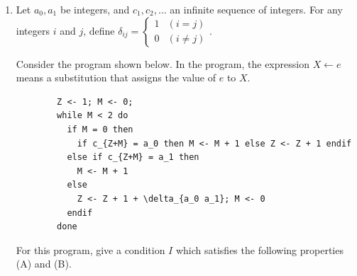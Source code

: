 \documentclass{article}
\begin{document}
\begin{enumerate}[label=\fbox{\arabic*}]
        Answer the following questions (1)-(4).
        \begin{enumerate}[label=(\arabic*)]
          \item Let us introduce the stream function $\psi(x, y, t)$ as a real-valued function defined by
          \[
            u = -\frac{\partial \psi}{\partial y}, \quad v = \frac{\partial \psi}{\partial x}.
          \]
          Show that the stream function satisfies the following equation
          \[
            \left( \frac{\partial^2}{\partial x^2} + \frac{\partial^2}{\partial y^2} \right)^2 \psi = 0.
          \]
          \item Let the motion of the boundary at $y = 0$ be given by
          \[
            X(a, t) = a + \epsilon \sin(ka - \omega t),
          \]
          where the constants $\epsilon, k$, and $\omega$ are the amplitude, wavenumber and frequency, respectively. Express $\left. \frac{\partial X(a, t)}{\partial t} \right|_{a = a(x, t)}$ in terms of $x$ and $t$ up to the order of $\epsilon^2$.
          \item Let us expand the stream function $\psi$ in a power function of $\epsilon$ as,
          \[
            \psi = \epsilon \psi_1 + \epsilon^2 \psi_2 + \cdots.
          \]
          Then, obtain $\psi_1$ by assuming the form of
          \[
            \psi_1 = \Psi(y) \cos(kx - \omega t).
          \]
          \item Evaluate the time-averaged velocity
          \[
            \langle u \rangle = \frac{1}{T} \int_0^T u \, dt
          \]
          up to the order of $\epsilon^2$ by calculating $\psi_2$. Here, $T = \frac{2\pi}{\omega}$ is the period of the oscillation.
        \end{enumerate}

  \item %
        Let $a_0, a_1$ be integers, and $c_1, c_2, \dots$ an infinite sequence of integers. For any integers $i$ and $j$, define $\delta_{ij} = \begin{cases} 1 & (i=j) \\ 0 & (i \neq j) \end{cases}$.
        
        Consider the program shown below. In the program, the expression $X \leftarrow e$ means a substitution that assigns the value of $e$ to $X$.
        \begin{verbatim}
        Z <- 1; M <- 0;
        while M < 2 do
          if M = 0 then
            if c_{Z+M} = a_0 then M <- M + 1 else Z <- Z + 1 endif
          else if c_{Z+M} = a_1 then
            M <- M + 1
          else
            Z <- Z + 1 + \delta_{a_0 a_1}; M <- 0
          endif
        done
        \end{verbatim}
        For this program, give a condition $I$ which satisfies the following properties (A) and (B).
        

\end{enumerate}
\end{document}
